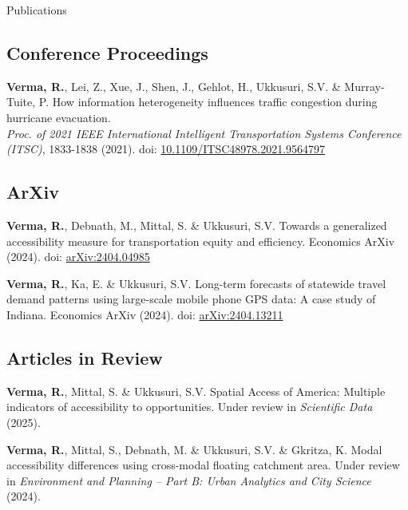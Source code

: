 \documentclass{CV} %
\begin{document}
\begin{rSection}{Publications}
\begin{etaremune}
    \end{etaremune}
    
    \subsection*{Conference Proceedings}
    \begin{etaremune}
        \item \textbf{Verma, R.}, Lei, Z., Xue, J., Shen, J., Gehlot, H., Ukkusuri, S.V. \& Murray-Tuite, P. How information heterogeneity influences traffic congestion during hurricane evacuation.
        \\ \textit{Proc. of 2021 IEEE International Intelligent Transportation Systems Conference (ITSC)}, 1833-1838 (2021). doi: \href{https://ieeexplore.ieee.org/document/9564797}{10.1109/ITSC48978.2021.9564797}
        
    \end{etaremune}

    \subsection*{ArXiv}
    \begin{etaremune}
        \item \textbf{Verma, R.}, Debnath, M., Mittal, S. \& Ukkusuri, S.V. Towards a generalized accessibility measure for transportation equity and efficiency. Economics ArXiv (2024). doi: \href{https://arxiv.org/abs/2404.04985}{arXiv:2404.04985}
        
        \item \textbf{Verma, R.}, Ka, E. \& Ukkusuri, S.V. Long-term forecasts of statewide travel demand patterns using large-scale mobile phone GPS data: A case study of Indiana. Economics ArXiv (2024). doi: \href{https://arxiv.org/abs/2404.13211}{arXiv:2404.13211}
    \end{etaremune}
    
    \subsection*{Articles in Review}
    \begin{etaremune}
        \item \textbf{Verma, R.}, Mittal, S. \& Ukkusuri, S.V. Spatial Access of America: Multiple indicators of accessibility to opportunities. Under review in \textit{Scientific Data} (2025).
        
        \item \textbf{Verma, R.}, Mittal, S., Debnath, M. \& Ukkusuri, S.V. \& Gkritza, K. Modal accessibility differences using cross-modal floating catchment area. Under review in \textit{Environment and Planning – Part B: Urban Analytics and City Science} (2024).
               

\end{etaremune}
\end{rSection}
\end{document}
